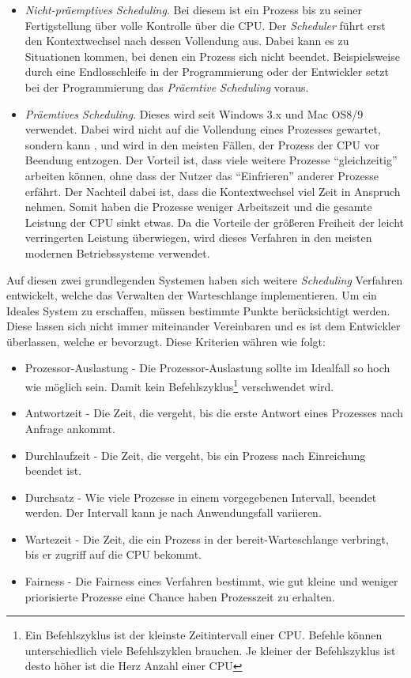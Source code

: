 \begin{itemize}
    \item \textit{Nicht-präemptives Scheduling}. Bei diesem ist ein Prozess bis zu seiner Fertigstellung über volle Kontrolle über die CPU. Der \textit{Scheduler} führt erst den Kontextwechsel nach dessen Vollendung aus. Dabei kann es zu Situationen kommen, bei denen ein Prozess sich nicht beendet. Beispielsweise durch eine Endlosschleife in der Programmierung oder der Entwickler setzt bei der Programmierung das \textit{Präemtive Scheduling} voraus.
    \item \textit{Präemtives Scheduling}. Dieses wird seit Windows 3.x und Mac OS8/9 verwendet. Dabei wird nicht auf die Vollendung eines Prozesses gewartet, sondern kann , und wird in den meisten Fällen, der Prozess der CPU vor Beendung entzogen. Der Vorteil ist, dass viele weitere Prozesse ``gleichzeitig'' arbeiten können, ohne dass der Nutzer das ``Einfrieren'' anderer Prozesse erfährt. Der Nachteil dabei ist, dass die Kontextwechsel viel Zeit in Anspruch nehmen. Somit haben die Prozesse weniger Arbeitszeit und die gesamte Leistung der CPU sinkt etwas. Da die Vorteile der größeren Freiheit der leicht verringerten Leistung überwiegen, wird dieses Verfahren in den meisten modernen Betriebssysteme verwendet. \cite{BetriebssystemeKompakt}
\end{itemize}

Auf diesen zwei grundlegenden Systemen haben sich weitere \textit{Scheduling} Verfahren entwickelt, welche das Verwalten der Warteschlange implementieren. Um ein Ideales System zu erschaffen, müssen bestimmte Punkte berücksichtigt werden. Diese lassen sich nicht immer miteinander Vereinbaren und es ist dem Entwickler überlassen, welche er bevorzugt. Diese Kriterien währen wie folgt: \cite{Scheduling:Williams}
\begin{itemize}
    \item Prozessor-Auslastung - Die Prozessor-Auslastung sollte im Idealfall so hoch wie möglich sein. Damit kein Befehlszyklus\footnote{Ein Befehlszyklus ist der kleinste Zeitintervall einer CPU. Befehle können unterschiedlich viele Befehlszyklen brauchen. Je kleiner der Befehlszyklus ist desto höher ist die Herz Anzahl einer CPU} verschwendet wird.
    \item Antwortzeit - Die Zeit, die vergeht, bis die erste Antwort eines Prozesses nach Anfrage ankommt.
    \item Durchlaufzeit - Die Zeit, die vergeht, bis ein Prozess nach Einreichung beendet ist.
    \item Durchsatz - Wie viele Prozesse in einem vorgegebenen Intervall, beendet werden. Der Intervall kann je nach Anwendungsfall variieren.
    \item Wartezeit - Die Zeit, die ein Prozess in der bereit-Warteschlange verbringt, bis er zugriff auf die CPU bekommt.
    \item Fairness - Die Fairness eines Verfahren bestimmt, wie gut kleine und weniger priorisierte Prozesse eine Chance haben Prozesszeit zu erhalten.
\end{itemize}

